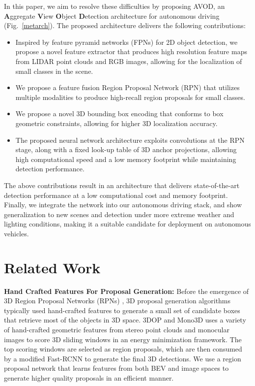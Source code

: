 \documentclass[letterpaper, 10 pt, conference]{ieeeconf}
\newcommand{\fig}[1]{Fig.~\ref{#1}}
\begin{document}
In this paper, we aim to resolve these difficulties by proposing AVOD, an \textbf{A}ggregate \textbf{V}iew \textbf{O}bject \textbf{D}etection architecture for autonomous driving (\fig{metarch}). The proposed architecture delivers the following contributions:
\begin{itemize}
    \item Inspired by feature pyramid networks (FPNs) \cite{lin2017feature} for 2D object detection, we propose a novel feature extractor that produces high resolution feature maps from LIDAR point clouds and RGB images, allowing for the localization of small classes in the scene.
    \item We propose a feature fusion Region Proposal Network (RPN) that utilizes multiple modalities to produce high-recall region proposals for small classes. 
    \item We propose a novel 3D bounding box encoding that conforms to box geometric constraints, allowing for higher 3D localization accuracy.
    \item The proposed neural network architecture exploits  convolutions at the RPN stage, along with a fixed look-up table of 3D anchor projections, allowing high computational speed and a low memory footprint while maintaining detection performance. 
\end{itemize}

 The above contributions result in an architecture that delivers state-of-the-art detection performance at a low computational cost and memory footprint. Finally, we integrate the network into our autonomous driving stack, and show generalization to new scenes and detection under more extreme weather and lighting conditions, making it a suitable candidate for deployment on autonomous vehicles.

\section{Related Work}
\label{related}
\noindent \textbf{Hand Crafted Features For Proposal Generation:} 
Before the emergence of 3D Region Proposal Networks (RPNs) \cite{ren2015faster}, 3D proposal generation algorithms typically used hand-crafted features to generate a small set of candidate boxes that retrieve most of the objects in 3D space. 3DOP \cite{nips15chen} and Mono3D \cite{cvpr16chen} uses a variety of hand-crafted geometric features from stereo point clouds and monocular images to score 3D sliding windows in an energy minimization framework. The top  scoring windows are selected as region proposals, which are then consumed by a modified Fast-RCNN \cite{girshick2015fast} to generate the final 3D detections. We use a region proposal network that learns features from both BEV and image spaces to generate higher quality proposals in an efficient manner.\\
\end{document}
